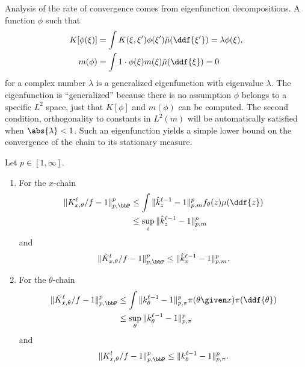 \documentclass[12pt]{article}
\begin{document}
Analysis of the rate of convergence comes from eigenfunction
decompositions.  A function \( \phi \) such that
\begin{align*}
    K[\phi(\xi )] &= \int K(\xi, \xi')\phi(\xi') \tilde{\mu}(\ddf{\xi'})
    = \lambda\phi (\xi), \\
    m(\phi) &= \int 1 \cdot \phi(\xi )m(\xi ) \tilde{\mu}(\ddf{\xi}) = 0
\end{align*}
for a complex number \( \lambda \) is a generalized eigenfunction%
with eigenvalue \( \lambda \).  The eigenfunction is ``generalized''
because there is no assumption \( \phi \) belongs to a specific \( L^2 \)
space, just that \( K[\phi] \) and \( m(\phi) \) can be computed.  The
second condition, orthogonality to constants in \( L^2(m) \) will be
automatically satisfied when \( \abs{\lambda} < 1 \).  Such an
eigenfunction yields a simple lower bound on the convergence of the
chain to its stationary measure.


\begin{lemma}
    Let \( p \in [1,\infty] \).
    \begin{enumerate}
        \item
            For the \( x \)-chain
            \begin{align*}
                \| K_{x,\theta}^{\ell}/f - 1\|_{p, \bbP}^p &\le \int \|
                \hat{k}_z^ {\ell-1} - 1\|_{p,m}^p f_{\theta}(z) \mu(\ddf
                {z}) \\
                & \le \sup_z \| \hat{k}_z^{\ell-1} - 1\|_{p,m}^p
            \end{align*}
            and
            \[
                \| \tilde{K}_{x,\theta}^l/f - 1 \|_{p,\bbP}^p \le \|
                \hat{k}_x^{\ell-1} - 1\|_{p,m}^p.
            \]
        \item
            For the \( \theta \)-chain
            \begin{align*}
                \| \tilde{K}_{x,\theta}^{\ell}/f - 1\|_{p, \bbP}^p &\le
                \int \| k_{\theta}^ {\ell-1} - 1\|_{p,\pi}^p \pi(\theta
                \given x) \pi(\ddf{\theta}) \\
                & \le \sup_{\theta} \| k_{\theta}^{\ell-1} - 1\|_{p,\pi}^p
            \end{align*}
            and
            \[
                \| K_{x,\theta}^l/f - 1 \|_{p,\bbP}^p \le \| k_{\theta}^
                {\ell-1} - 1\|_{p,\pi}^p.
            \]
    \end{enumerate}
\end{lemma}
\end{document}
